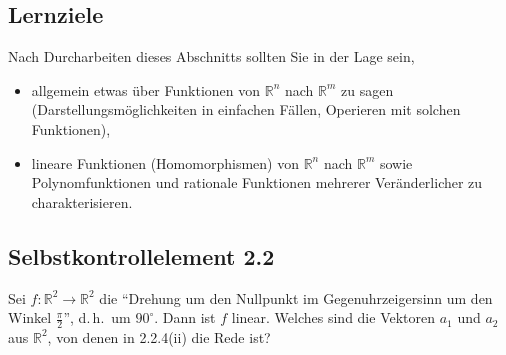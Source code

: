 \documentclass[a4paper,12pt]{article}
\begin{document}
\begin{center}
\end{center}

\subsection*{Lernziele}

Nach Durcharbeiten dieses Abschnitts sollten Sie in der Lage sein,
\begin{itemize}
  \item allgemein etwas über Funktionen von $\mathbb{R}^n$ nach $\mathbb{R}^m$ zu
        sagen (Darstellungsmöglichkeiten in einfachen Fällen, Operieren mit solchen
        Funktionen),
  \item lineare Funktionen (Homomorphismen) von $\mathbb{R}^n$ nach $\mathbb{R}^m$
        sowie Polynomfunktionen und rationale Funktionen mehrerer Veränderlicher zu
        charakterisieren.
\end{itemize}

\subsection*{Selbstkontrollelement 2.2}

Sei $f : \mathbb{R}^2 \to \mathbb{R}^2$ die "`Drehung um den Nullpunkt im
Gegenuhrzeigersinn um den Winkel $\tfrac{\pi}{2}$"', d.\,h.\ um $90^\circ$. Dann ist
$f$ linear. Welches sind die Vektoren $a_1$ und $a_2$ aus $\mathbb{R}^2$, von denen
in 2.2.4(ii) die Rede ist?
\end{document}
